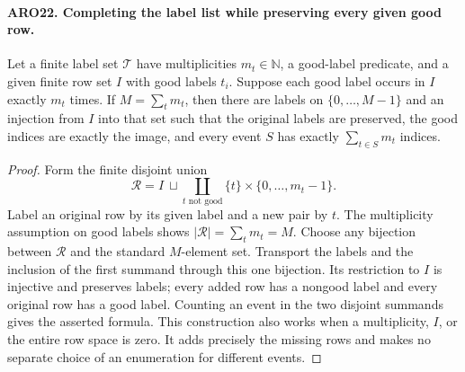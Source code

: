 \documentclass[11pt,a4paper]{article}
\numberwithin{equation}{section}
\theoremstyle{remark}\newtheorem{remark}[theorem]{Remark}
\begin{document}
\paragraph{ARO22. Completing the label list while preserving every given good row.}
\label{claim:ARO22}
Let a finite label set \(\mathcal T\) have multiplicities
\(m_t\in\mathbb N\), a good-label predicate, and a given finite
row set \(I\) with good labels \(t_i\).  Suppose each good label
occurs in \(I\) exactly \(m_t\) times.  If
\(M=\sum_tm_t\), then there are labels on \(\{0,\ldots,M-1\}\)
and an injection from \(I\) into that set such that the original
labels are preserved, the good indices are exactly the image, and
every event \(S\) has exactly \(\sum_{t\in S}m_t\) indices.
\begin{proof}
Form the finite disjoint union
\[
                \mathcal R=I\ \sqcup\!
                  \coprod_{t\text{ not good}}\{t\}\times\{0,\ldots,m_t-1\}.
 \tag{ARO.25}
\]
Label an original row by its given label and a new pair by \(t\).
The multiplicity assumption on good labels shows
\(|\mathcal R|=\sum_tm_t=M\).  Choose any bijection between
\(\mathcal R\) and the standard \(M\)-element set.  Transport the
labels and the inclusion of the first summand through this one
bijection.  Its restriction to \(I\) is injective and preserves
labels; every added row has a nongood label and every original
row has a good label.  Counting an event in the two disjoint
summands gives the asserted formula.  This construction also works
when a multiplicity, \(I\), or the entire row space is zero.
It adds precisely the missing rows and makes no separate choice
of an enumeration for different events.
\end{proof}

\end{document}

